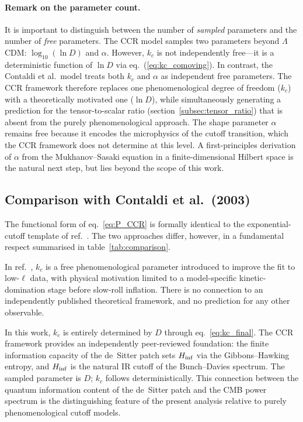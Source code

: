 \paragraph{Remark on the parameter count.}
It is important to distinguish between the number of \emph{sampled}
parameters and the number of \emph{free} parameters.  The CCR model
samples two parameters beyond $\Lambda$CDM: $\log_{10}(\ln D)$ and
$\alpha$.  However, $k_c$ is not independently free---it is a
deterministic function of $\ln D$ via eq.~(\ref{eq:kc_comoving}).
In contrast, the Contaldi et al.\ model treats both $k_c$ and
$\alpha$ as independent free parameters.  The CCR framework therefore
replaces one phenomenological degree of freedom ($k_c$) with a
theoretically motivated one ($\ln D$), while simultaneously
generating a prediction for the tensor-to-scalar ratio
(section~\ref{subsec:tensor_ratio}) that is absent from the purely
phenomenological approach.  The shape parameter $\alpha$ remains free
because it encodes the microphysics of the cutoff transition, which
the CCR framework does not determine at this level.  A first-principles
derivation of $\alpha$ from the Mukhanov--Sasaki equation in a
finite-dimensional Hilbert space is the natural next step, but lies
beyond the scope of this work.

\subsection{Comparison with Contaldi et al.\ (2003)}
\label{subsec:contaldi}

The functional form of eq.~\eqref{eq:P_CCR} is formally identical to the
exponential-cutoff template of ref.~\cite{Contaldi:2003}. The two approaches
differ, however, in a fundamental respect summarised in
table~\ref{tab:comparison}.

In ref.~\cite{Contaldi:2003}, $k_c$ is a free phenomenological parameter
introduced to improve the fit to low-$\ell$ data, with physical motivation
limited to a model-specific kinetic-domination stage before slow-roll
inflation. There is no connection to an independently published theoretical
framework, and no prediction for any other observable.

In this work, $k_c$ is entirely determined by $D$ through
eq.~\eqref{eq:kc_final}. The CCR framework \cite{Chronis:2026} provides an
independently peer-reviewed foundation: the finite information capacity of
the de~Sitter patch sets $H_{\rm inf}$ via the Gibbons--Hawking entropy,
and $H_{\rm inf}$ is the natural IR cutoff of the Bunch--Davies spectrum.
The sampled parameter is $D$; $k_c$ follows deterministically.
This connection between the quantum information content of the
de~Sitter patch and the CMB power spectrum is the distinguishing
feature of the present analysis relative to purely phenomenological
cutoff models.

